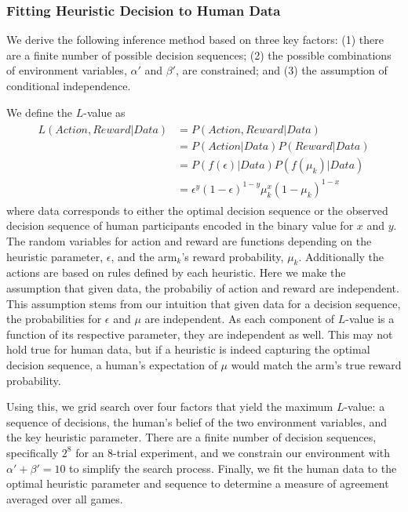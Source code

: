 \subsubsection{Fitting Heuristic Decision to Human Data}
We derive the following inference method based on three key factors: (1) there are a finite number of possible decision sequences; (2) the possible combinations of environment variables, $\alpha'$ and $\beta'$, are constrained; and (3) the assumption of conditional independence.

We define the $L$-value as 
\begin{align}
\begin{split}
	\label{eq:likelihood}
	L(Action,Reward|Data) &= P(Action,Reward|Data) \\
						  &= P(Action|Data) P(Reward|Data) \\
						  &= P(f(\epsilon)|Data) P(f(\mu_k)|Data) \\
						  &= \epsilon^y (1-\epsilon)^{1-y} \mu_k^x (1-\mu_k)^{1-x}
\end{split}
\end{align}
where data corresponds to either the optimal decision sequence or the observed decision sequence of human participants encoded in the binary value for $x$ and $y$. The random variables for action and reward are functions depending on the heuristic parameter, $\epsilon$, and the arm$_k$'s reward probability, $\mu_k$. Additionally the actions are based on rules defined by each heuristic. Here we make the assumption that given data, the probabiliy of action and reward are independent. This assumption stems from our intuition that given data for a decision sequence, the probabilities for $\epsilon$ and $\mu$ are independent. As each component of $L$-value is a function of its respective parameter, they are independent as well. This may not hold true for human data, but if a heuristic is indeed capturing the optimal decision sequence, a human's expectation of $\mu$ would match the arm's true reward probability.

Using this, we grid search over four factors that yield the maximum $L$-value: a sequence of decisions, the human's belief of the two environment variables, and the key heuristic parameter. There are a finite number of decision sequences, specifically $2^8$ for an 8-trial experiment, and we constrain our environment with $\alpha'+\beta'=10$ to simplify the search process. Finally, we fit the human data to the optimal heuristic parameter and sequence to determine a measure of agreement averaged over all games.



